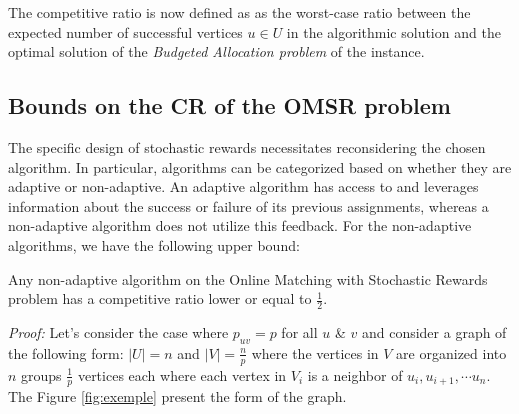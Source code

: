 \documentclass[12pt, twocolumn]{article}
\begin{document}
\par
\hspace{\parindent}The competitive ratio is now defined as as the worst-case ratio  between the expected number
of successful vertices $u \in U$ in the algorithmic solution and the optimal solution of the \textit{Budgeted Allocation problem} of the instance. 


\subsection{Bounds on the CR of the OMSR problem}

\par
\hspace{\parindent}The specific design of stochastic rewards necessitates reconsidering the chosen algorithm. In particular, algorithms can be categorized based on whether they are adaptive or non-adaptive. An adaptive algorithm has access to and leverages information about the success or failure of its previous assignments, whereas a non-adaptive algorithm does not utilize this feedback. For the non-adaptive algorithms, we have the following upper bound:

\begin{theorem}
    Any non-adaptive algorithm on the Online Matching with Stochastic Rewards problem has a competitive ratio lower or equal to $\frac{1}{2}$.
\end{theorem}

\par
\hspace{\parindent}\textit{Proof:} Let's consider the case where $p_{uv}=p$ for all $u$ \& $v$ and consider a graph of the following form: $|U|=n$ and $|V|= \frac{n}{p}$ where the vertices in $V$ are organized into $n$ groups $\frac{1}{p}$ vertices each where each vertex in $V_i$ is a neighbor of $u_i, u_{i+1}, \cdots u_n$. The Figure \ref{fig:exemple} present the form of the graph.
\end{document}
